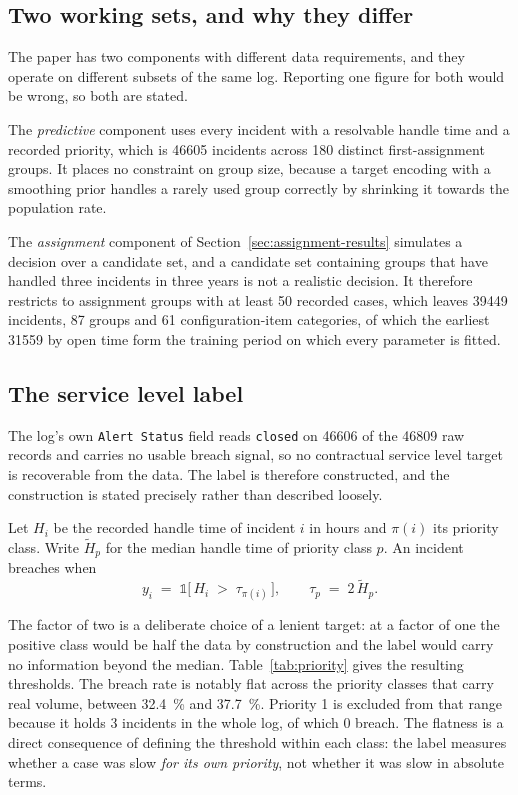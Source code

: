 \subsection{Two working sets, and why they differ}
\label{sec:two-sets}

The paper has two components with different data requirements, and they operate on different
subsets of the same log. Reporting one figure for both would be wrong, so both are stated.

The \emph{predictive} component uses every incident with a resolvable handle time and a
recorded priority, which is \num{46605} incidents across \num{180} distinct first-assignment
groups. It places no constraint on group size, because a target encoding with a smoothing prior
handles a rarely used group correctly by shrinking it towards the population rate.

The \emph{assignment} component of Section~\ref{sec:assignment-results} simulates a decision
over a candidate set, and a candidate set containing groups that have handled three incidents
in three years is not a realistic decision. It therefore restricts to assignment groups with at
least \num{50} recorded cases, which leaves \num{39449} incidents, \num{87} groups and
\num{61} configuration-item categories, of which the earliest \num{31559} by open time form the
training period on which every parameter is fitted.

\subsection{The service level label}
\label{sec:label}

The log's own \texttt{Alert Status} field reads \texttt{closed} on \num{46606} of the
\num{46809} raw records and carries no usable breach signal, so no contractual service level
target is recoverable from the data. The label is therefore constructed, and the construction
is stated precisely rather than described loosely.

Let $H_i$ be the recorded handle time of incident $i$ in hours and $\pi(i)$ its priority class.
Write $\tilde{H}_{p}$ for the median handle time of priority class $p$. An incident breaches
when
\begin{equation}
y_i \;=\; \mathbb{1}\bigl[\, H_i \;>\; \tau_{\pi(i)} \,\bigr],
\qquad \tau_{p} \;=\; 2\,\tilde{H}_{p}.
\label{eq:label}
\end{equation}

The factor of two is a deliberate choice of a lenient target: at a factor of one the positive
class would be half the data by construction and the label would carry no information beyond
the median. Table~\ref{tab:priority} gives the resulting thresholds. The breach rate is
notably flat across the priority classes that carry real volume, between \SI{32.4}{\percent} and
\SI{37.7}{\percent}. Priority 1 is excluded from that range because it holds \num{3} incidents in the whole log, of which \num{0} breach. The flatness is a direct consequence of defining the threshold within each class: the label measures
whether a case was slow \emph{for its own priority}, not whether it was slow in absolute terms.

